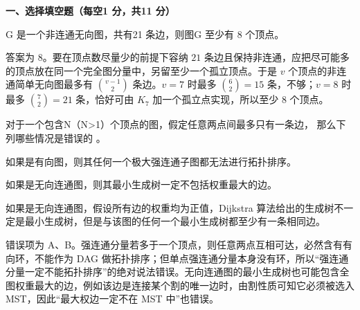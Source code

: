 

\textbf{一、选择填空题（每空1 分，共11 分）}
\begin{question}
G 是一个非连通无向图，共有21 条边，则图G 至少有  8  个顶点。
\begin{solution}
答案为 $8$。要在顶点数尽量少的前提下容纳 $21$ 条边且保持非连通，应把尽可能多的顶点放在同一个完全图分量中，另留至少一个孤立顶点。于是 $v$ 个顶点的非连通简单无向图最多有 $\binom{v-1}{2}$ 条边。$v=7$ 时最多 $\binom62=15$ 条，不够；$v=8$ 时最多 $\binom72=21$ 条，恰好可由 $K_7$ 加一个孤立点实现，所以至少 $8$ 个顶点。
\end{solution}
\end{question}

\begin{question}
对于一个包含N（N>1）个顶点的图，假定任意两点间最多只有一条边，
那么下列哪些情况是错误的 \blank\blank。
\begin{choiceoptions}[1]
\item 如果是有向图，则其任何一个极大强连通子图都无法进行拓扑排序。
\item 如果是无向连通图，则其最小生成树一定不包括权重最大的边。
\item 如果是无向连通图，假设所有边的权重均为正值，Dijkstra 算法给出的生成树不一定是最小生成树，但是与该图的任何一个最小生成树都至少有一条相同边。
\end{choiceoptions}
\begin{solution}
错误项为 A、B。强连通分量若多于一个顶点，则任意两点互相可达，必然含有有向环，不能作为 DAG 做拓扑排序；但单点强连通分量本身没有环，所以“强连通分量一定不能拓扑排序”的绝对说法错误。无向连通图的最小生成树也可能包含全图权重最大的边，例如该边是连接某个割的唯一边时，由割性质可知它必须被选入 MST，因此“最大权边一定不在 MST 中”也错误。
\end{solution}
\end{question}

